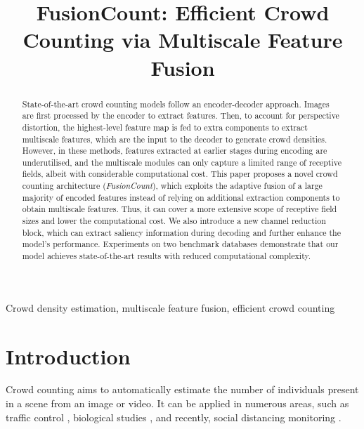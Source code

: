 \documentclass{article}
\title{FusionCount: Efficient Crowd Counting via Multiscale Feature Fusion}
\begin{document}
\date{}
\ninept
\maketitle
\begin{abstract}
State-of-the-art crowd counting models follow an encoder-decoder approach. Images are first processed by the encoder to extract features. Then, to account for perspective distortion, the highest-level feature map is fed to extra components to extract multiscale features, which are the input to the decoder to generate crowd densities. However, in these methods, features extracted at earlier stages during encoding are underutilised, and the multiscale modules can only capture a limited range of receptive fields, albeit with considerable computational cost. This paper proposes a novel crowd counting architecture (\emph{FusionCount}), which exploits the adaptive fusion of a large majority of encoded features instead of relying on additional extraction components to obtain multiscale features. Thus, it can cover a more extensive scope of receptive field sizes and lower the computational cost. We also introduce a new channel reduction block, which can extract saliency information during decoding and further enhance the model's performance. Experiments on two benchmark databases demonstrate that our model achieves state-of-the-art results with reduced computational complexity.
\end{abstract}

\begin{keywords}
Crowd density estimation, multiscale feature fusion, efficient crowd counting
\end{keywords}

\section{Introduction}
\label{sec:intro}

Crowd counting aims to automatically estimate the number of individuals present in a scene from an image or video. It can be applied in numerous areas, such as traffic control \cite{6514618}, biological studies \cite{lu2017tasselnet}, and recently,  social distancing monitoring \cite{9562868}.
\end{document}
